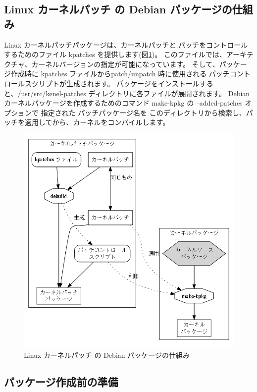 \documentclass[mingoth,a4paper]{jsarticle}
\begin{document}
\subsection{Linux カーネルパッチ の Debian パッケージの仕組み}
Linux カーネルパッチパッケージは、カーネルパッチと パッチをコントロールするためのファイル kpatches を提供します(図\ref{fig:kpatch0})。
このファイルでは、アーキテクチャ、カーネルバージョンの指定が可能になっています。
そして、パッケージ作成時に kpatches ファイルからpatch/unpatch 時に使用される パッチコントロールスクリプトが生成されます。
パッケージをインストールすると、/usr/src/kenel-patches ディレクトリに各ファイルが展開されます。
Debian カーネルパッケージを作成するためのコマンド make-kpkg の --added-patches オプションで 指定された
パッチパッケージ名を このディレクトリから検索し、パッチを適用してから、カーネルをコンパイルします。
\begin{figure}[h]
 \begin{center}
  \includegraphics[width=0.8\hsize]{image200807/kpatch0.png}
 \end{center}
 \caption{Linux カーネルパッチ の Debian パッケージの仕組み}
 \label{fig:kpatch0}
\end{figure}

\subsection{パッケージ作成前の準備}
\end{document}

